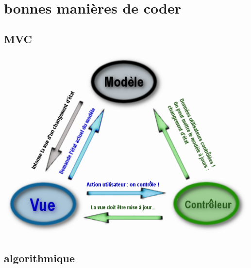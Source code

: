 \documentclass[french]{beamer}%
\begin{document}
	\section{bonnes manières de coder}
	
		\subsection{MVC}
		
			\begin{frame}
				\begin{center}
					\includegraphics[scale=0.3]{MVCschema}
				\end{center}
			\end{frame}
	
		\subsection{algorithmique}
		
\end{document}
